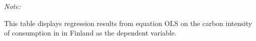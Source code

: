 \begin{table}[htbp!]
\begin{adjustbox}{width = 1\textwidth, max height = 0.95\textheight, center}
\begin{threeparttable}[b]
         \begin{tablenotes}\item \medskip \textit{Note:}
            \item This table displays regression results from equation OLS on the carbon intensity of consumption in  in Finland as the dependent variable. 
         \end{tablenotes}
      \end{threeparttable}
   \end{adjustbox}
\end{table}


